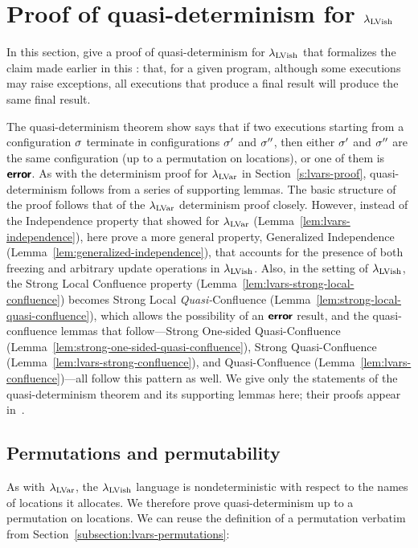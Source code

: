 \section{Proof of quasi-determinism for $\lambda_{\textrm{LVish}}$}\label{s:quasi-proof-of-quasi-determinism}

In this section,  give a proof of quasi-determinism for
$\lambda_{\textrm{LVish}}$ that formalizes the claim made earlier in this :
that, for a given program, although some executions may raise
exceptions, all executions that produce a final result will produce
the same final result.

The quasi-determinism theorem  show says that if two executions
starting from a configuration $\sigma$ terminate in configurations
$\sigma'$ and $\sigma''$, then either $\sigma'$ and $\sigma''$ are the
same configuration (up to a permutation on locations), or one of them
is $\textbf{\textsf{error}}$.  As with the determinism proof for $\lambda_{\textrm{LVar}}$
in Section~\ref{s:lvars-proof}, quasi-determinism follows from a
series of supporting lemmas.  The basic structure of the proof follows
that of the $\lambda_{\textrm{LVar}}$ determinism proof closely.  However, instead
of the Independence property that  showed for $\lambda_{\textrm{LVar}}$
(Lemma~\ref{lem:lvars-independence}), here  prove a more general property,
Generalized Independence (Lemma~\ref{lem:generalized-independence}),
that accounts for the presence of both freezing and arbitrary update
operations in $\lambda_{\textrm{LVish}}$.  Also, in the setting of $\lambda_{\textrm{LVish}}$,
the Strong Local Confluence property
(Lemma~\ref{lem:lvars-strong-local-confluence}) becomes Strong Local
\emph{Quasi-}Confluence
(Lemma~\ref{lem:strong-local-quasi-confluence}), which allows the
possibility of an $\textbf{\textsf{error}}$ result, and the quasi-confluence lemmas
that follow---Strong One-sided Quasi-Confluence
(Lemma~\ref{lem:strong-one-sided-quasi-confluence}), Strong
Quasi-Confluence (Lemma~\ref{lem:lvars-strong-confluence}), and
Quasi-Confluence (Lemma~\ref{lem:lvars-confluence})---all follow this
pattern as well.
\ifdefined\JOURNAL
We give only the statements of the quasi-determinism theorem and its
supporting lemmas here; their proofs appear
in~\cite{lvars-dissertation}.
\fi

\subsection{Permutations and permutability}\label{subsection:quasi-permutations}

As with $\lambda_{\textrm{LVar}}$, the $\lambda_{\textrm{LVish}}$ language is nondeterministic with
respect to the names of locations it allocates.  We therefore prove
quasi-determinism up to a permutation on locations.  We can reuse the
definition of a permutation verbatim from
Section~\ref{subsection:lvars-permutations}:

